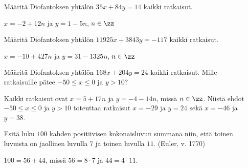 \begin{tehtava}
    Määritä Diofantoksen yhtälön $35x + 84y = 14$ kaikki ratkaisut.
    
    \begin{vastaus}
        $x = -2 + 12n$ ja $y = 1 - 5n$, $n\in\zz$
    \end{vastaus}
    
\end{tehtava}

\begin{tehtava}
    Määritä Diofantoksen yhtälön $11925x + 3843y = -117$ kaikki ratkaisut.
    
    \begin{vastaus}
        $x = -10 + 427n$ ja $y = 31 - 1325n$, $n\in\zz$
    \end{vastaus}
    
\end{tehtava}

\begin{tehtava}
    Määritä Diofantoksen yhtälön $168x + 204y = 24$ kaikki ratkaisut. Mille ratkaisuille pätee $-50 \le x \le 0$ ja $y > 10$?
    
    \begin{vastaus}
        Kaikki ratkaisut ovat $x = 5 + 17n$ ja $y = -4 - 14n$, missä $n\in\zz$. Niistä ehdot $-50 \le x \le 0$ ja $y > 10$ toteuttaa ratkaisut $x = -29$ ja $y = 24$ sekä $x = -46$ ja $y = 38$.
    \end{vastaus}
    
\end{tehtava}

\begin{tehtava}
    Esitä luku $100$ kahden positiivisen kokonaisluvun summana niin, että toinen luvuista on jaollinen luvulla $7$ ja toinen luvulla $11$. (Euler, v. 1770)
    
    \begin{vastaus}
        $100 = 56 + 44$, missä $56 = 8 \cdot 7$ ja $44 = 4 \cdot 11$.
    \end{vastaus}
    
\end{tehtava}
